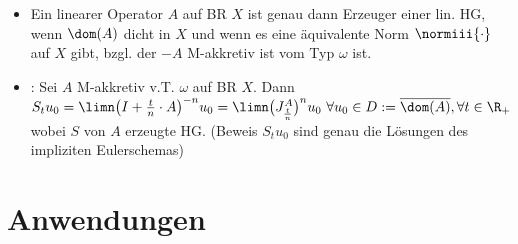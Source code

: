 \begin{itemize}
		\item Ein linearer Operator $A$ auf BR $X$ ist genau dann Erzeuger einer lin. HG, wenn $\dom(A)$ dicht in $X$ und wenn es eine äquivalente Norm $\normiii{\cdot}$ auf $X$ gibt, bzgl. der $-A$ M-akkretiv ist vom Typ $\omega$ ist.
		\item {}: Sei $A$ M-akkretiv v.T. $\omega$ auf BR $X$. Dann\\
		$S_tu_0=\limn\big(I+\frac{t}{n}\cdot A\big)^{-n} u_0=\limn \big(J_{\frac{t}{n}}^A\big)^n u_0~\forall u_0\in D:=\overline{\dom(A)},\forall t\in\R_+$ wobei $S$ von $A$ erzeugte HG.
		(Beweis $S_tu_0$ sind genau die Lösungen des impliziten Eulerschemas)
	\end{itemize}
	
	\section{Anwendungen}
